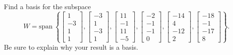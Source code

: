 \documentclass{article}
\begin{document}
\begin{exerciseStatement}
    Find a basis for the subspace
\[W=\mathrm{span}\ \left\{\left[\begin{array}{r}
1 \\
-3 \\
1 \\
1
\end{array}\right] , \left[\begin{array}{r}
-3 \\
1 \\
-3 \\
1
\end{array}\right] , \left[\begin{array}{r}
11 \\
-1 \\
11 \\
-5
\end{array}\right] , \left[\begin{array}{r}
-2 \\
-1 \\
-1 \\
0
\end{array}\right] , \left[\begin{array}{r}
-14 \\
4 \\
-12 \\
2
\end{array}\right] , \left[\begin{array}{r}
-18 \\
-1 \\
-17 \\
8
\end{array}\right]\right\}.\]
 Be sure to explain why your result is a basis.


  
\end{exerciseStatement}
\end{document}
